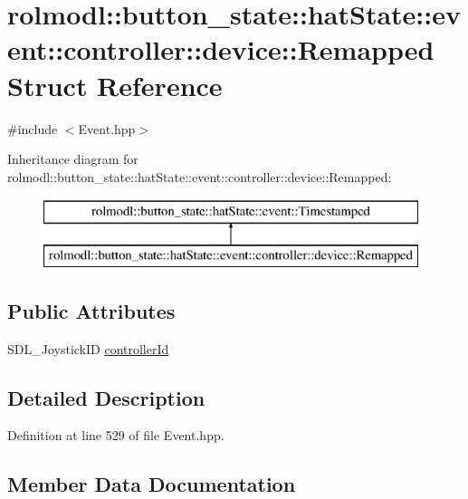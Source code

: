 \hypertarget{structrolmodl_1_1button__state_1_1hat_state_1_1event_1_1controller_1_1device_1_1_remapped}{}\section{rolmodl\+::button\+\_\+state\+::hat\+State\+::event\+::controller\+::device\+::Remapped Struct Reference}
\label{structrolmodl_1_1button__state_1_1hat_state_1_1event_1_1controller_1_1device_1_1_remapped}


{\ttfamily \#include $<$Event.\+hpp$>$}

Inheritance diagram for rolmodl\+::button\+\_\+state\+::hat\+State\+::event\+::controller\+::device\+::Remapped\+:\begin{figure}[H]
\begin{center}
\leavevmode
\includegraphics[height=2.000000cm]{structrolmodl_1_1button__state_1_1hat_state_1_1event_1_1controller_1_1device_1_1_remapped}
\end{center}
\end{figure}
\subsection*{Public Attributes}
\begin{DoxyCompactItemize}
\item 
S\+D\+L\+\_\+\+Joystick\+ID \mbox{\hyperlink{structrolmodl_1_1button__state_1_1hat_state_1_1event_1_1controller_1_1device_1_1_remapped_a5358e4b818f1d337eda3e7121311811c}{controller\+Id}}
\end{DoxyCompactItemize}


\subsection{Detailed Description}


Definition at line 529 of file Event.\+hpp.



\subsection{Member Data Documentation}
\mbox{\label{structrolmodl_1_1button__state_1_1hat_state_1_1event_1_1controller_1_1device_1_1_remapped_a5358e4b818f1d337eda3e7121311811c}} 
